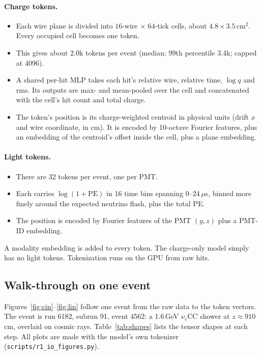 \documentclass[11pt,a4paper]{article}
\newcommand{\nue}{\ensuremath{\nu_e}}
\newcommand{\code}[1]{\texttt{\small #1}}
\begin{document}
\paragraph{Charge tokens.}
\begin{itemize}
  \item Each wire plane is divided into $16$-wire $\times$ $64$-tick cells, about $4.8\times3.5$\,cm$^2$. Every occupied cell becomes one token.
  \item This gives about 2.0k tokens per event (median; 99th percentile 3.4k; capped at 4096).
  \item A shared per-hit MLP takes each hit's relative wire, relative time, $\log q$ and rms. Its outputs are max- and mean-pooled over the cell and concatenated with the cell's hit count and total charge.
  \item The token's position is its charge-weighted centroid in physical units (drift $x$ and wire coordinate, in cm). It is encoded by 10-octave Fourier features, plus an embedding of the centroid's offset inside the cell, plus a plane embedding.
\end{itemize}

\paragraph{Light tokens.}
\begin{itemize}
  \item There are 32 tokens per event, one per PMT.
  \item Each carries $\log(1+\mathrm{PE})$ in 16 time bins spanning 0--24\,$\mu$s, binned more finely around the expected neutrino flash, plus the total PE.
  \item The position is encoded by Fourier features of the PMT $(y,z)$ plus a PMT-ID embedding.
\end{itemize}

A modality embedding is added to every token. The charge-only model simply has no light tokens. Tokenization runs on the GPU from raw hits.

\subsection{Walk-through on one event}\label{sec:walk}
Figures~\ref{fig:cin}--\ref{fig:lin} follow one event from the raw data to the token vectors. The event is run 6182, subrun 91, event 4562: a 1.6\,GeV \nue CC shower at $z\approx910$\,cm, overlaid on cosmic rays. Table~\ref{tab:shapes} lists the tensor shapes at each step. All plots are made with the model's own tokenizer (\code{scripts/r1\_io\_figures.py}).
\end{document}
